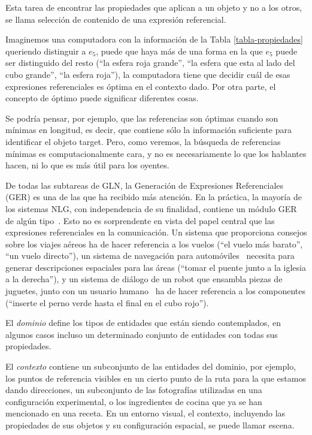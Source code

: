 Esta tarea de encontrar las propiedades que aplican a un objeto y no a los otros, se llama selecci\'on de contenido de una expresi\'on referencial.  

Imaginemos una computadora con la informaci\'on de la Tabla \ref{tabla-propiedades} queriendo distinguir a $e_5$, puede que haya m\'as de una forma en la que $e_5$ puede ser distinguido del resto (``la esfera roja grande'', ``la esfera que esta al lado del cubo grande'', ``la esfera roja''), la computadora tiene que decidir cu\'al de esas expresiones referenciales es \'optima en el contexto dado. Por otra parte, el concepto de \'optimo puede significar diferentes cosas.

Se podr\'{i}a pensar, por ejemplo, que las referencias son \'optimas cuando son m\'{i}nimas en longitud, es decir, 
que contiene s\'olo la informaci\'on suficiente para identificar el objeto target. Pero, como veremos, la b\'usqueda de referencias m\'{i}nimas
es computacionalmente cara, y no es necesariamente lo que los hablantes hacen, ni lo que es m\'as \'util para los oyentes.

De todas las subtareas de GLN, la Generaci\'on de Expresiones Referenciales (GER) es
una de las que ha recibido m\'as atenci\'on. En la pr\'actica, la mayor\'ia de los
sistemas NLG, con independencia de su finalidad, contiene un m\'odulo GER de alg\'un tipo~\cite{Mellish2004}. Esto no es sorprendente
en vista del papel central que las expresiones referenciales en la comunicaci\'on. Un sistema que proporciona
consejos sobre los viajes a\'ereos \cite{white2010generating} ha de hacer referencia a los vuelos (``el
vuelo m\'as barato'', ``un vuelo directo''), un sistema de navegaci\'on para autom\'oviles~\cite{Drager:2012:GLN:2380816.2380908}
necesita para generar descripciones espaciales para las \'areas (``tomar el puente junto a la iglesia a la derecha''),
y un sistema de di\'alogo de un robot que ensambla piezas de juguetes, junto con un usuario humano~\cite{foster-etal-ijcai2009} ha de hacer referencia a los componentes (``inserte el perno verde hasta el final en el cubo rojo'').

El {\it dominio} define los tipos de entidades que est\'an siendo contemplados, en algunos
casos incluso un determinado conjunto de entidades con todas sus propiedades.

El {\it contexto} contiene un subconjunto de las entidades del dominio, por ejemplo, los puntos de referencia visibles en un cierto punto de la ruta para la que estamos dando direcciones, un subconjunto de las fotograf\'ias utilizadas en una configuraci\'on experimental, o los ingredientes de cocina que ya se han mencionado en una receta. En un entorno visual, el contexto, incluyendo las
propiedades de sus objetos y su configuraci\'on espacial, se puede llamar escena. 


